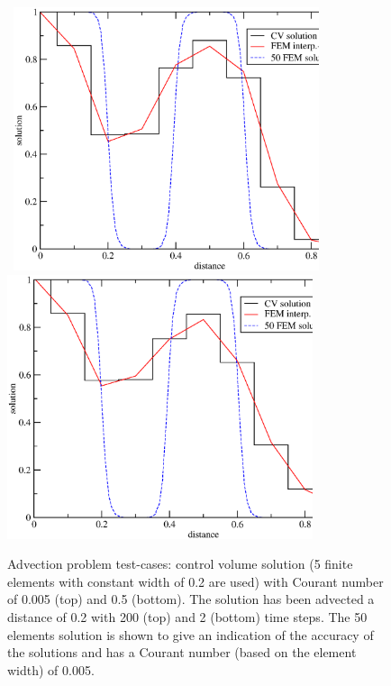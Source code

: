 \begin{figure}[h]
 
  \begin{center}
\vbox{\hbox{\hspace{1cm}
    \includegraphics[width=0.8\textwidth]{diagrams/compar-dg.eps}}
   \hbox{ \hspace{1cm} \includegraphics[width=0.8\textwidth]{diagrams/compar-dg-bdt.eps}}}
    \caption{Advection problem test-cases: control volume solution (5
      finite elements with constant width of 0.2 are used) with
      Courant number of 0.005 (top) and 0.5 (bottom).  The solution
      has been advected a distance of 0.2 with 200 (top) and 2
      (bottom) time steps. The 50 elements solution is shown to give
      an indication of the accuracy of the solutions and has a Courant
      number (based on the element width) of 0.005.\label{compar-dg}}
  \end{center}
\end{figure}

